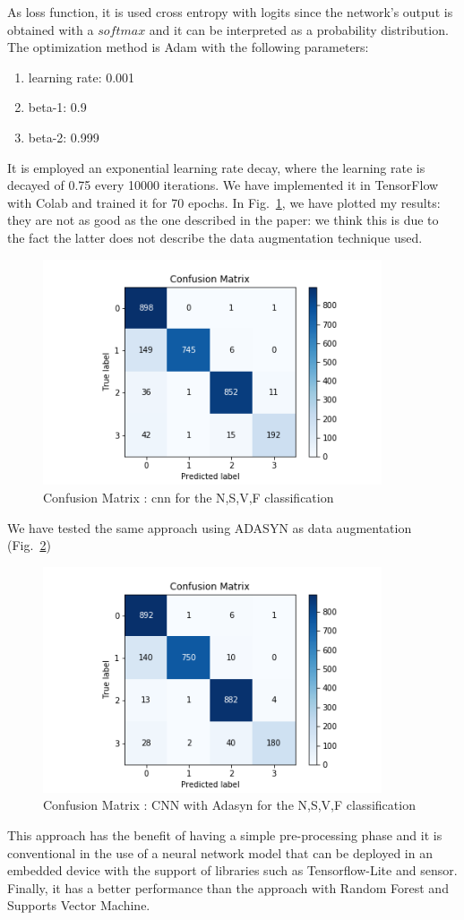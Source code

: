 \documentclass[LaM,binding=0.6cm]{sapthesis}
\begin{document}
As loss function, it is used cross entropy with logits since the network's output is obtained with a $softmax$ and it can be interpreted as a probability distribution. The optimization method is Adam with the following parameters:
\begin{enumerate}
\item learning rate: 0.001
\item beta-1: 0.9
\item beta-2: 0.999
\end{enumerate}
It is employed an exponential learning rate decay, where the learning rate is decayed of 0.75 every 10000 iterations. We have implemented it in TensorFlow with Colab and trained it for 70 epochs. In Fig.~\ref{fig:cnn1}, we have plotted my results: they are not as good as the one described in the paper: we think this is due to the fact the latter does not describe the data augmentation technique used.
\begin{figure}  \centering
    \includegraphics[width=100mm,scale=0.7]{cnn-no-data-aug.png}
    \caption{Confusion Matrix : cnn for the N,S,V,F classification}
    \label{fig:cnn1}
\end{figure}
We have tested the same approach using ADASYN as data augmentation (Fig.~\ref{fig:cnn2})
\begin{figure}   \centering
    \includegraphics[width=100mm,scale=0.7]{cnn-adasyn.png}
    \caption{Confusion Matrix : CNN with Adasyn for the N,S,V,F classification}
    \label{fig:cnn2}
\end{figure}
This approach has the benefit of having a simple pre-processing phase and it is conventional in the use of a neural network model that can be deployed in an embedded device with the support of libraries such as Tensorflow-Lite and sensor. Finally, it has a better performance than the approach with Random Forest and Supports Vector Machine.
\end{document}
